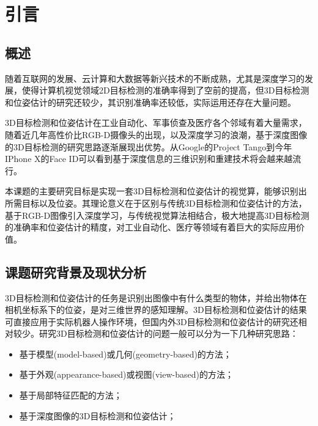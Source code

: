 \chapter{引言}
\label{chap:introduction}
\section{概述}
随着互联网的发展、云计算和大数据等新兴技术的不断成熟，尤其是深度学习的发展，使得计算机视觉领域2D目标检测的准确率得到了空前的提高，但3D目标检测和位姿估计的研究还较少，其识别准确率还较低，实际运用还存在大量问题。

3D目标检测和位姿估计在工业自动化、军事侦查及医疗各个邻域有着大量需求，随着近几年高性价比RGB-D摄像头的出现，以及深度学习的浪潮，基于深度图像的3D目标检测的研究思路逐渐展现出优势。从Google的Project Tango到今年IPhone X的Face ID可以看到基于深度信息的三维识别和重建技术将会越来越流行。

本课题的主要研究目标是实现一套3D目标检测和位姿估计的视觉算，能够识别出所需目标以及位姿。其理论意义在于区别与传统3D目标检测和位姿估计的方法，基于RGB-D图像引入深度学习，与传统视觉算法相结合，极大地提高3D目标检测的准确率和位姿估计的精度，对工业自动化、医疗等领域有着巨大的实际应用价值。

\section{课题研究背景及现状分析}
3D目标检测和位姿估计的任务是识别出图像中有什么类型的物体，并给出物体在相机坐标系下的位姿，是对三维世界的感知理解。3D目标检测和位姿估计的结果可直接应用于实际机器人操作环境，但国内外3D目标检测和位姿估计的研究还相对较少。研究3D目标检测和位姿估计的问题一般可以分为一下几种研究思路：
\begin{itemize}
\item 基于模型(model-based)或几何(geometry-based)的方法；
\item 基于外观(appearance-based)或视图(view-based)的方法；
\item 基于局部特征匹配的方法； 
\item 基于深度图像的3D目标检测和位姿估计；
\end{itemize}

